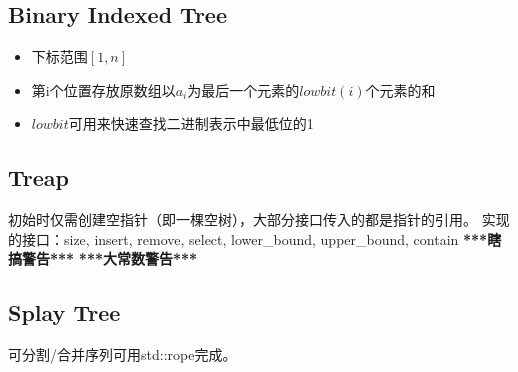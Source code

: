 	\subsection{Binary Indexed Tree}
		\begin{flushleft}
			\begin{itemize}
				\item 下标范围$[1, n]$
				\item 第i个位置存放原数组以$a_{i}$为最后一个元素的$lowbit(i)$个元素的和
				\item $lowbit$可用来快速查找二进制表示中最低位的1
			\end{itemize}
		\end{flushleft}
		
	\newpage
	\subsection{Treap}
		\begin{flushleft}
			初始时仅需创建空指针（即一棵空树），大部分接口传入的都是指针的引用。
			\linebreak 实现的接口：size, insert, remove, select, lower\_bound, upper\_bound, contain
			\linebreak \textbf{***瞎搞警告***}
			\linebreak \textbf{***大常数警告***}
		\end{flushleft}
		
	\newpage
	\subsection{Splay Tree}
		\begin{flushleft}
			可分割/合并序列可用std::rope完成。
		\end{flushleft}
		
